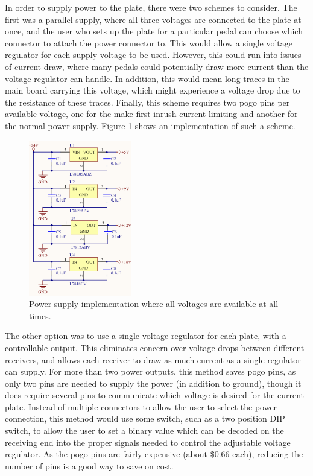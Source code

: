 \documentclass{article}
\begin{document}
		In order to supply power to the plate, there were two schemes to consider.  The first was a parallel supply, where all three voltages are connected to the plate at once, and the user who sets up the plate for a particular pedal can choose which connector to attach the power connector to.  This would allow a single voltage regulator for each supply voltage to be used.  However, this could run into issues of current draw, where many pedals could potentially draw more current than the voltage regulator can handle.  In addition, this would mean long traces in the main board carrying this voltage, which might experience a voltage drop due to the resistance of these traces.  Finally, this scheme requires two pogo pins per available voltage, one for the make-first inrush current limiting and another for the normal power supply.  Figure \ref{fig:parallelpowerschematic} shows an implementation of such a scheme.

		\begin{figure}
			\centering
			\includegraphics[width = 0.4\textwidth]{PR2Images/ParallelPowerSchematic.PNG}
			\caption{Power supply implementation where all voltages are available at all times.}
			\label{fig:parallelpowerschematic}
		\end{figure}

		The other option was to use a single voltage regulator for each plate, with a controllable output.  This eliminates concern over voltage drops between different receivers, and allows each receiver to draw as much current as a single regulator can supply.  For more than two power outputs, this method saves pogo pins, as only two pins are needed to supply the power (in addition to ground), though it does require several pins to communicate which voltage is desired for the current plate.  Instead of multiple connectors to allow the user to select the power connection, this method would use some switch, such as a two position DIP switch, to allow the user to set a binary value which can be decoded on the receiving end into the proper signals needed to control the adjustable voltage regulator.  As the pogo pins are fairly expensive (about \$0.66 each), reducing the number of pins is a good way to save on cost.
\end{document}
